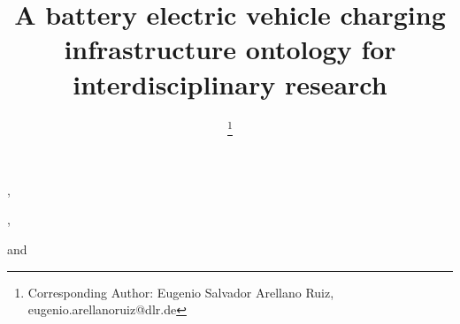 \documentclass{IOS-Book-Article}
\theoremstyle{empty}
\theoremstyle{emptybreak}
\def\hb{\hbox to 11.5 cm{}}
\begin{document}
\pagestyle{headings}
\def\thepage{}
\begin{frontmatter}              %


\title{A battery electric vehicle charging infrastructure ontology for interdisciplinary research}


\author[A]{ %
\thanks{Corresponding Author: Eugenio Salvador Arellano Ruiz, eugenio.arellanoruiz@dlr.de}},
\author[A]{ },
\author[A]{ }
and
\author[A]{ }

\address[A]{German Aerospace Center (DLR), Department of Energy Systems Analysis, Institute of Networked
Energy Systems, Stuttgart, Germany}


\begin{keyword}

\end{keyword}
\end{frontmatter}















\end{document}
